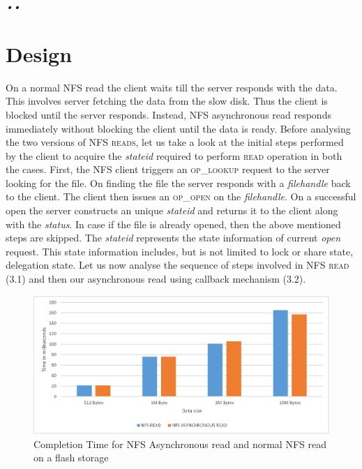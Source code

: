 \textit{\emph{•\emph{\textit{•}}}}\section{Design}

\label{Design}

On a normal NFS read the client waits till the server responds with the data. This involves server fetching the data from the slow disk. Thus the client is blocked until the server responds. Instead, NFS asynchronous read responds immediately without blocking the client until the data is ready. Before analysing the two versions of \textsc{NFS reads}, let us take a look at the initial steps performed by the client to acquire the \textit{stateid} required to perform \textsc{read} operation in both the cases. First, the NFS client triggers an \textsc{op\_lookup} request to the server looking for the file. On finding the file the server responds with a \textit{filehandle} back to the client. The client then issues an \textsc{op\_open} on the \textit{filehandle}. On a successful open the server constructs an unique \textit{stateid} and returns it to the client along with the \textit{status}. In case if the file is already opened, then the above mentioned steps are skipped. The \textit{stateid} represents the state information of current \textit{open} request. This state information includes, but is not limited to lock or share state, delegation state. Let us now analyse the sequence of steps involved in \textsc{NFS read} (3.1) and then our asynchronous read using callback mechanism (3.2).

\begin{figure}
\centering
\includegraphics[scale=1.0]{figures/completion_time.eps}
\caption{Completion	Time for NFS Asynchronous read and normal NFS read on a flash storage}
\label{fig:NFSCompletionTimes}
\end{figure}  

